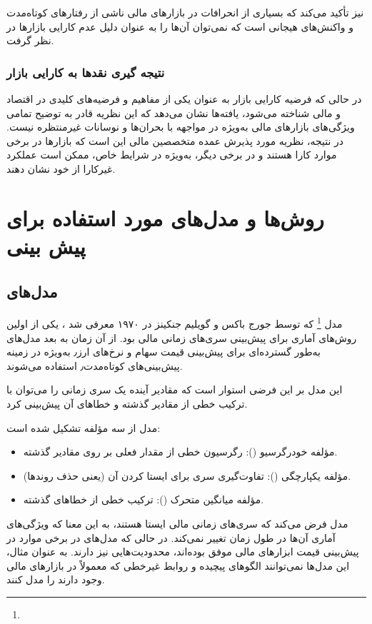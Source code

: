\cite{fama1991efficient} نیز تأکید می‌کند که بسیاری از انحرافات در بازارهای مالی ناشی از رفتارهای کوتاه‌مدت و واکنش‌های هیجانی است که نمی‌توان آن‌ها را به عنوان دلیل عدم کارایی بازارها در نظر گرفت.

\subsubsection{نتیجه گیری نقد‌ها به کارایی بازار}
در حالی که فرضیه کارایی بازار به عنوان یکی از مفاهیم و فرضیه‌های کلیدی در اقتصاد و مالی شناخته می‌شود، یافته‌ها نشان می‌دهد که این نظریه قادر به توضیح تمامی ویژگی‌های بازارهای مالی به‌ویژه در مواجهه با بحران‌ها و نوسانات غیرمنتظره نیست. در نتیجه، نظریه مورد پذیرش عمده متخصصین مالی این است که بازارها در برخی موارد کارا هستند و در برخی دیگر، به‌ویژه در شرایط خاص، ممکن است عملکرد غیرکارا از خود نشان دهند.
\section{روش‌ها و مدل‌های مورد استفاده برای پیش بینی}
\subsection{مدل‌های }
مدل \footnote{} که توسط جورج باکس و گویلیم جنکینز در ۱۹۷۰ معرفی شد \cite{box1976time}، یکی از اولین روش‌های آماری برای پیش‌بینی سری‌های زمانی مالی بود. از آن زمان به بعد مدل‌های  به‌طور گسترده‌ای برای پیش‌بینی قیمت سهام و نرخ‌های ارز٫ به‌ویژه در زمینه پیش‌بینی‌های کوتاه‌مدت٫ استفاده می‌شوند. 

این مدل بر این فرضی استوار است که مقادیر آینده یک سری زمانی را می‌توان با ترکیب خطی از مقادیر گذشته و خطاهای آن پیش‌بینی کرد.

مدل  از سه مؤلفه تشکیل شده است:
\begin{itemize}
	\item مؤلفه خودرگرسیو (): رگرسیون خطی از مقدار فعلی بر روی مقادیر گذشته.
	\item مؤلفه یکپارچگی (): تفاوت‌گیری سری برای ایستا کردن آن (یعنی حذف روندها).
	\item مؤلفه میانگین متحرک (): ترکیب خطی از خطاهای گذشته.
\end{itemize}

مدل  فرض می‌کند که سری‌های زمانی مالی ایستا هستند، به این معنا که ویژگی‌های آماری آن‌ها در طول زمان تغییر نمی‌کند. در حالی که مدل‌های  در برخی موارد در پیش‌بینی قیمت ابزارهای مالی موفق بوده‌اند، محدودیت‌هایی نیز دارند. به عنوان مثال، این مدل‌ها نمی‌توانند الگوهای پیچیده و روابط غیرخطی که معمولاً در بازارهای مالی وجود دارند را مدل کنند.
